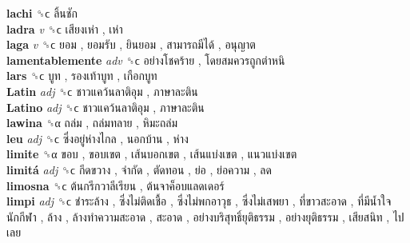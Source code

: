 \textbf{lachi} ␝ϲ   ลิ้นชัก   \\
\textbf{ladra} \emph{v}  ␝ϲ   เสียงเห่า ,  เห่า   \\
\textbf{laga} \emph{v}  ␝ϲ   ยอม ,  ยอมรับ ,  ยินยอม ,  สามารถมีได้ ,  อนุญาต   \\
\textbf{lamentablemente} \emph{adv}  ␝ϲ   อย่างโชคร้าย ,  โดยสมควรถูกตำหนิ   \\
\textbf{lars} ␝ϲ   บูท ,  รองเท้าบูท ,  เกือกบูท   \\
\textbf{Latin} \emph{adj}  ␝ϲ   ชาวแคว้นลาติอุม ,  ภาษาละติน   \\
\textbf{Latino} \emph{adj}  ␝ϲ   ชาวแคว้นลาติอุม ,  ภาษาละติน   \\
\textbf{lawina} ␝α   ถล่ม ,  ถล่มทลาย ,  หิมะถล่ม   \\
\textbf{leu} \emph{adj}  ␝ϲ   ซึ่งอยู่ห่างไกล ,  นอกบ้าน ,  ห่าง   \\
\textbf{limite} ␝α   ขอบ ,  ขอบเขต ,  เส้นบอกเขต ,  เส้นแบ่งเขต ,  แนวแบ่งเขต   \\
\textbf{limitá} \emph{adj}  ␝ϲ   กีดขวาง ,  จำกัด ,  ตัดทอน ,  ย่อ ,  ย่อความ ,  ลด   \\
\textbf{limosna} ␝ϲ   ต้นกรีกวาลีเรียน ,  ต้นจาค็อบแลดเดอร์   \\
\textbf{limpi} \emph{adj}  ␝ϲ   ชำระล้าง ,  ซึ่งไม่ติดเชื้อ ,  ซึ่งไม่พกอาวุธ ,  ซึ่งไม่เสพยา ,  ที่ขาวสะอาด ,  ที่มีน้ำใจนักกีฬา ,  ล้าง ,  ล้างทำความสะอาด ,  สะอาด ,  อย่างบริสุทธิ์ยุติธรรม ,  อย่างยุติธรรม ,  เสียสนิท ,  ไปเลย   \\
